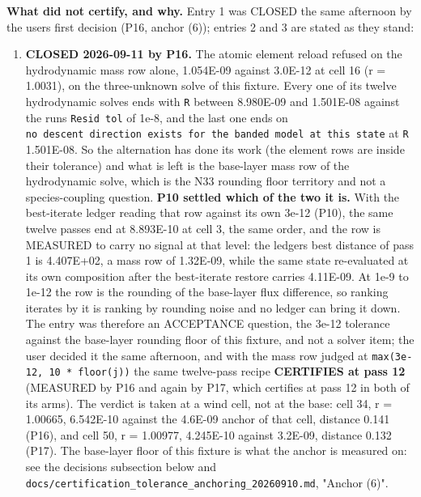 \documentclass[english,a4paper]{my_memo}
\providecommand{\tightlist}{\setlength{\itemsep}{0pt}\setlength{\parskip}{0pt}}
\begin{document}
\textbf{What did not certify, and why.} Entry 1 was CLOSED the same afternoon by
the user\textquotesingle s first decision (P16, anchor (6)); entries 2 and 3 are stated as
they stand:

\begin{enumerate}
\def\labelenumi{\arabic{enumi}.}
\tightlist
\item
  \textbf{CLOSED 2026-09-11 by P16.} The atomic element reload refused on the
  hydrodynamic mass row alone,
  1.054E-09 against 3.0E-12 at cell 16 (r = 1.0031), on the three-unknown
  solve of this fixture. Every one of its twelve hydrodynamic solves ends
  with \texttt{\textbar{}\textbar{}R\textbar{}\textbar{}} between 8.980E-09 and 1.501E-08 against the run\textquotesingle s \texttt{Resid\ tol}
  of 1e-8, and the last one ends on \texttt{no\ descent\ direction\ exists\ for\ the\ banded\ model\ at\ this\ state} at \texttt{\textbar{}\textbar{}R\textbar{}\textbar{}} 1.501E-08. So the alternation has
  done its work (the element rows are inside their tolerance) and what is
  left is the base-layer mass row of the hydrodynamic solve, which is the
  N33 rounding floor territory and not a species-coupling question.
  \textbf{P10 settled which of the two it is.} With the best-iterate ledger
  reading that row against its own 3e-12 (P10), the same twelve passes end at
  8.893E-10 at cell 3, the same order, and the row is MEASURED to carry no
  signal at that level: the ledger\textquotesingle s best distance of pass 1 is 4.407E+02, a
  mass row of 1.32E-09, while the same state re-evaluated at its own
  composition after the best-iterate restore carries 4.11E-09. At 1e-9 to
  1e-12 the row is the rounding of the base-layer flux difference, so ranking
  iterates by it is ranking by rounding noise and no ledger can bring it
  down. The entry was therefore an ACCEPTANCE question, the 3e-12 tolerance
  against the base-layer rounding floor of this fixture, and not a solver
  item; the user decided it the same afternoon, and with the mass row judged
  at \texttt{max(3e-12,\ 10\ *\ floor(j))} the same twelve-pass recipe \textbf{CERTIFIES at
  pass 12} (MEASURED by P16 and again by P17, which certifies at pass 12 in
  both of its arms). The verdict is taken at a wind cell, not at the base:
  cell 34, r = 1.00665, 6.542E-10 against the 4.6E-09 anchor of that cell,
  distance 0.141 (P16), and cell 50, r = 1.00977, 4.245E-10 against 3.2E-09,
  distance 0.132 (P17). The base-layer floor of this fixture is what the
  anchor is measured on: see the decisions subsection below and
  \texttt{docs/certification\_tolerance\_anchoring\_20260910.md}, "Anchor (6)".

\end{enumerate}
\end{document}
